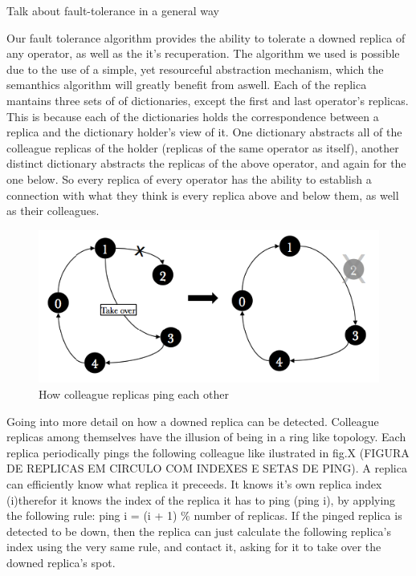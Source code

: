 \documentclass[times, 10pt,twocolumn]{article}
\begin{document}
Talk about fault-tolerance in a general way

Our fault tolerance algorithm provides the ability to tolerate a downed
replica of any operator, as well as the it's recuperation.  The algorithm
we used is possible due to the use of a simple, yet resourceful
abstraction mechanism, which the semanthics algorithm will greatly benefit
from aswell.  Each of the replica mantains three sets of of dictionaries,
except the first and last operator's replicas. This is because each of the
dictionaries holds the correspondence between a replica and the dictionary
holder's view of it.  One dictionary abstracts all of the colleague
replicas of the holder (replicas of the same operator as itself), another
distinct dictionary abstracts the replicas of the above operator, and
again for the one below.  So every replica of every operator has the
ability to establish a connection with what they think is every replica
above and below them, as well as their colleagues.


\begin{figure}[h]
	\includegraphics[width=\columnwidth]{fault_detection} \caption{How
	colleague replicas ping each other} 
\end{figure}

Going into more detail on how a downed replica can be detected.  Colleague
replicas among themselves have the illusion of being in a ring like
topology. Each replica periodically pings the following colleague like
ilustrated in fig.X (FIGURA DE REPLICAS EM CIRCULO COM INDEXES E SETAS DE
PING). A replica can efficiently know what replica it preceeds. It knows
it's own replica index (i)therefor it knows the index of the replica it
has to ping (ping i), by applying the following rule: ping i = (i + 1) \%
number of replicas.  If the pinged replica is detected to be down, then
the replica can just calculate the following replica's index using the
very same rule, and contact it, asking for it to take over the downed
replica's spot. 
\end{document}
